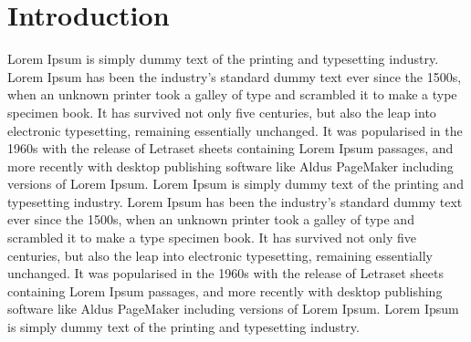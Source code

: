 \section{Introduction}
Lorem Ipsum is simply dummy text of the printing and typesetting industry.
Lorem Ipsum has been the industry's standard dummy text ever since the 1500s,
when an unknown printer took a galley of type and scrambled it to make a type specimen book.
It has survived not only five centuries, but also the leap into electronic typesetting,
remaining essentially unchanged. It was popularised in the 1960s with the release of Letraset sheets
containing Lorem Ipsum passages, and more recently with desktop publishing software like Aldus PageMaker
including versions of Lorem Ipsum. Lorem Ipsum is simply dummy text of the printing and typesetting industry.
Lorem Ipsum has been the industry's standard dummy text ever since the 1500s,
when an unknown printer took a galley of type and scrambled it to make a type specimen book.
It has survived not only five centuries, but also the leap into electronic typesetting,
remaining essentially unchanged. It was popularised in the 1960s with the release of Letraset sheets
containing Lorem Ipsum passages, and more recently with desktop publishing software like Aldus PageMaker
including versions of Lorem Ipsum. Lorem Ipsum is simply dummy text of the printing and typesetting industry.

